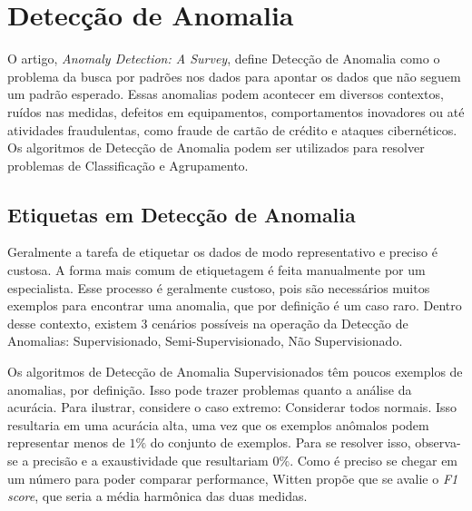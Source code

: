 

\section{Detecção de Anomalia}

O artigo, \textit{Anomaly Detection: A Survey}\cite{chandola2009anomaly}, define Detecção de Anomalia como o problema da busca por padrões nos dados para apontar os dados que não seguem um padrão esperado. Essas anomalias podem acontecer em diversos contextos, ruídos nas medidas, defeitos em equipamentos, comportamentos inovadores ou até atividades fraudulentas, como fraude de cartão de crédito e ataques cibernéticos. Os algoritmos de Detecção de Anomalia podem ser utilizados para resolver problemas de Classificação e Agrupamento.

\subsection{Etiquetas em Detecção de Anomalia}

Geralmente a tarefa de etiquetar os dados de modo representativo e preciso é custosa. A forma mais comum de etiquetagem é feita manualmente por um especialista. Esse processo é geralmente custoso, pois são necessários muitos exemplos para encontrar uma anomalia, que por definição é um caso raro. Dentro desse contexto, existem 3 cenários possíveis na operação da Detecção de Anomalias: Supervisionado, Semi-Supervisionado, Não Supervisionado.

Os algoritmos de Detecção de Anomalia Supervisionados têm poucos exemplos de anomalias, por definição. Isso pode trazer problemas quanto a análise da acurácia. Para ilustrar, considere o caso extremo: Considerar todos normais. Isso resultaria em uma acurácia alta, uma vez que os exemplos anômalos podem representar menos de \(1\%\) do conjunto de exemplos. Para se resolver isso, observa-se a precisão e a exaustividade que resultariam \(0\%\). Como é preciso se chegar em um número para poder comparar performance, Witten\cite{witten2011data} propõe que se avalie o \textit{F1 score}, que seria a média harmônica das duas medidas.

